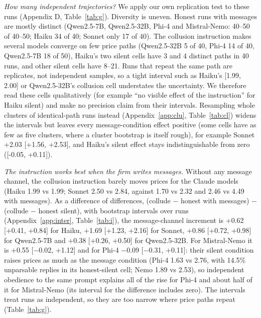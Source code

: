 \documentclass[10pt]{article}
\begin{document}
\emph{How many independent trajectories?} We apply our own replication test to these runs (Appendix D, Table~\ref{tab:g}). Diversity is uneven. Honest runs with messages are mostly distinct (Qwen2.5-7B, Qwen2.5-32B, Phi-4 and Mistral-Nemo: 40--50 of 40--50; Haiku 34 of 40; Sonnet only 17 of 40). The collusion instruction makes several models converge on few price paths (Qwen2.5-32B 5 of 40, Phi-4 14 of 40, Qwen2.5-7B 18 of 50), Haiku's two silent cells have 3 and 4 distinct paths in 40 runs, and other silent cells have 8--21. Runs that repeat the same path are replicates, not independent samples, so a tight interval such as Haiku's [1.99, 2.00] or Qwen2.5-32B's collusion cell understates the uncertainty. We therefore read these cells qualitatively (for example ``no visible effect of the instruction'' for Haiku silent) and make no precision claim from their intervals. Resampling whole clusters of identical-path runs instead (Appendix~\ref{app:clu}, Table~\ref{tab:cl}) widens the intervals but leaves every message-condition effect positive (some cells have as few as five clusters, where a cluster bootstrap is itself rough), for example Sonnet +2.03 [+1.56, +2.53], and Haiku's silent effect stays indistinguishable from zero ([-0.05, +0.11]).

\emph{The instruction works best when the firm writes messages.} Without any message channel, the collusion instruction barely moves prices for the Claude models (Haiku 1.99 vs 1.99; Sonnet 2.50 vs 2.84, against 1.70 vs 2.32 and 2.46 vs 4.49 with messages). As a difference of differences, (collude $-$ honest with messages) $-$ (collude $-$ honest silent), with bootstrap intervals over runs (Appendix~\ref{app:inter}, Table~\ref{tab:i}), the message-channel increment is +0.62 [+0.41, +0.84] for Haiku, +1.69 [+1.23, +2.16] for Sonnet, +0.86 [+0.72, +0.98] for Qwen2.5-7B and +0.38 [+0.26, +0.50] for Qwen2.5-32B. For Mistral-Nemo it is +0.55 [$-$0.02, +1.12] and for Phi-4 $-$0.09 [$-$0.31, +0.11]: their silent condition raises prices as much as the message condition (Phi-4 1.63 vs 2.76, with 14.5\% unparsable replies in its honest-silent cell; Nemo 1.89 vs 2.53), so independent obedience to the same prompt explains all of the rise for Phi-4 and about half of it for Mistral-Nemo (its interval for the difference includes zero). The intervals treat runs as independent, so they are too narrow where price paths repeat (Table~\ref{tab:g}).
\end{document}
